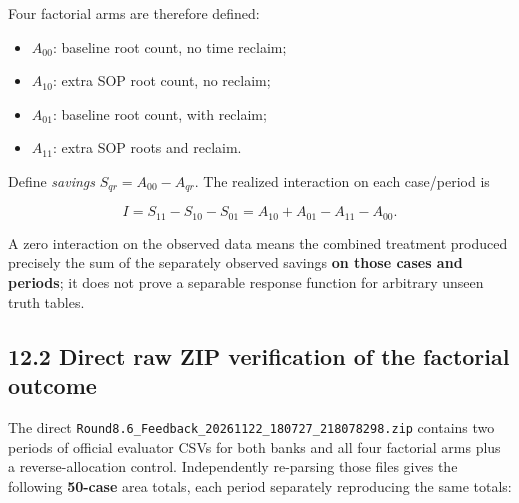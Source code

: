 Four factorial arms are therefore defined:

\begin{itemize}
\tightlist
\item
  \(A_{00}\): baseline root count, no time reclaim;
\item
  \(A_{10}\): extra SOP root count, no reclaim;
\item
  \(A_{01}\): baseline root count, with reclaim;
\item
  \(A_{11}\): extra SOP roots and reclaim.
\end{itemize}

Define \emph{savings} \(S_{qr}=A_{00}-A_{qr}\). The realized interaction on each case/period is

\[
I=S_{11}-S_{10}-S_{01}
=A_{10}+A_{01}-A_{11}-A_{00}.
\]

A zero interaction on the observed data means the combined treatment produced precisely the sum of the separately observed savings \textbf{on those cases and periods}; it does not prove a separable response function for arbitrary unseen truth tables.

\subsection{12.2 Direct raw ZIP verification of the factorial outcome}\label{direct-raw-zip-verification-of-the-factorial-outcome}

The direct \texttt{Round8.6\_Feedback\_20261122\_180727\_218078298.zip} contains two periods of official evaluator CSVs for both banks and all four factorial arms plus a reverse-allocation control. Independently re-parsing those files gives the following \textbf{50-case} area totals, each period separately reproducing the same totals:

